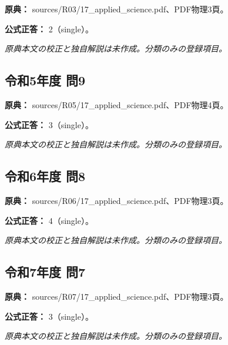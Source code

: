 \noindent\textbf{原典：} sources/R03/17\_applied\_science.pdf、PDF物理3頁。

\textbf{公式正答：} 2（single）。

\par\textit{原典本文の校正と独自解説は未作成。分類のみの登録項目。}

\subsection{令和5年度 問9}
\label{q:r05-reg-applied-09}

\noindent\textbf{原典：} sources/R05/17\_applied\_science.pdf、PDF物理4頁。

\textbf{公式正答：} 3（single）。

\par\textit{原典本文の校正と独自解説は未作成。分類のみの登録項目。}

\subsection{令和6年度 問8}
\label{q:r06-reg-applied-08}

\noindent\textbf{原典：} sources/R06/17\_applied\_science.pdf、PDF物理3頁。

\textbf{公式正答：} 4（single）。

\par\textit{原典本文の校正と独自解説は未作成。分類のみの登録項目。}

\subsection{令和7年度 問7}
\label{q:r07-reg-applied-07}

\noindent\textbf{原典：} sources/R07/17\_applied\_science.pdf、PDF物理3頁。

\textbf{公式正答：} 3（single）。

\par\textit{原典本文の校正と独自解説は未作成。分類のみの登録項目。}
